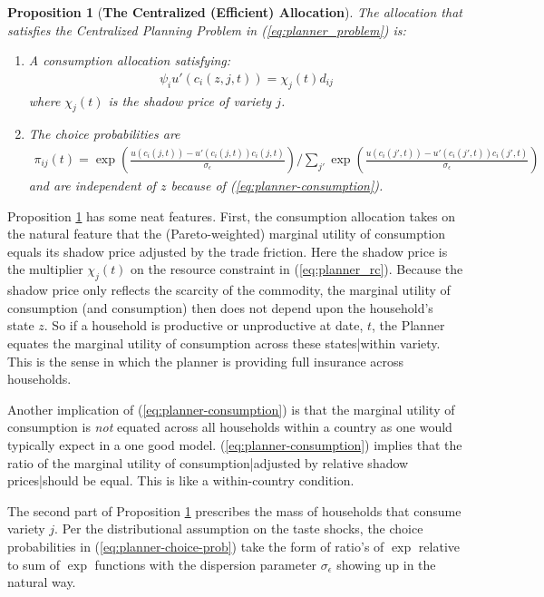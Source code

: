 \documentclass[12pt,pdftex]{article}
\newtheorem{prp}{Proposition}
\begin{document}
\begin{onehalfspacing}
\begin{prp}[\textbf{The Centralized (Efficient) Allocation}]\label{prp:efficient-allocation} The allocation that satisfies the Centralized Planning Problem in (\ref{eq:planner_problem}) is:
\begin{enumerate}
\item A consumption allocation satisfying:
\begin{align}
\psi_{i} u'(c_{i}(z,j,t) ) = \chi_{j}(t) d_{ij}
\label{eq:planner-consumption}
\end{align}
where $\chi_{j}(t)$ is the shadow price of variety $j$.
\item The choice probabilities are
\begin{align}
\pi_{ij}(t) =\exp \left( \frac{u(c_{i}(j, t)) - u'(c_{i}(j, t))c_{i}(j,t)}{\sigma_{\epsilon}}\right) \bigg / \sum_{j'}\exp \left( \frac{u(c_{i}(j',t)) - u'(c_{i}(j', t))c_{i}(j', t)}{\sigma_{\epsilon}} \right)
\label{eq:planner-choice-prob}
\end{align}
and are independent of $z$ because of (\ref{eq:planner-consumption}).
\end{enumerate}
\end{prp}
Proposition \ref{prp:efficient-allocation} has some neat features. First, the consumption allocation takes on the natural feature that the (Pareto-weighted) marginal utility of consumption equals its shadow price adjusted by the trade friction. Here the shadow price is the multiplier $\chi_{j}(t)$ on the resource constraint in (\ref{eq:planner_rc}). Because the shadow price only reflects the scarcity of the commodity, the marginal utility of consumption (and consumption) then does not depend upon the household's state $z$. So if a household is productive or unproductive at date, $t$, the Planner equates the marginal utility of consumption across these states|within variety. This is the sense in which the planner is providing full insurance across households.

Another implication of (\ref{eq:planner-consumption}) is that the marginal utility of consumption is \textit{not} equated across all households within a country as one would typically expect in a one good model. (\ref{eq:planner-consumption}) implies that the ratio of the marginal utility of consumption|adjusted by relative shadow prices|should be equal. This is like a within-country \citet{backus1993} condition.

The second part of Proposition \ref{prp:efficient-allocation} prescribes the mass of households that consume variety $j$. Per the distributional assumption on the taste shocks, the choice probabilities in (\ref{eq:planner-choice-prob}) take the form of ratio's of $\exp$ relative to sum of $\exp$ functions with the dispersion parameter $\sigma_{\epsilon}$ showing up in the natural way.


\end{onehalfspacing}
\end{document}
